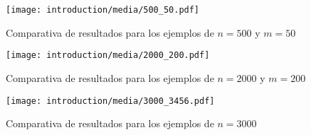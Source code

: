 \begin{figure}[h]
    \centering
    \texttt{[image: introduction/media/500\_50.pdf]}
    \caption{Comparativa de resultados para los ejemplos de $n = 500$ y $m = 50$}
    \label{fig:500_50}
\end{figure}


\begin{figure}[h]
    \centering
    \texttt{[image: introduction/media/2000\_200.pdf]}
    \caption{Comparativa de resultados para los ejemplos de $n = 2000$ y $m = 200$}
    \label{fig:2000_200}
\end{figure}


\begin{figure}[h]
    \centering
    \texttt{[image: introduction/media/3000\_3456.pdf]}
    \caption{Comparativa de resultados para los ejemplos de $n = 3000$}
    \label{fig:3000_3456}
\end{figure}


